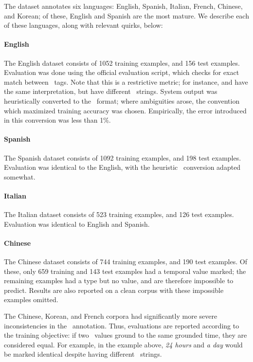 The dataset annotates six languages:
  English, Spanish, Italian, French, Chinese, and Korean;
  of these, English and Spanish are the most mature.
We describe each of these languages, along with relevant quirks, below:

\paragraph{English}
The English dataset consists of 1052 training examples, and 156 test examples.
Evaluation was done using the official evaluation script, which checks for
  exact match between \timex\ tags.
Note that this is a restrictive metric; for instance,  and
   have the same interpretation, but
  have different \timex\ strings.
System output was heuristically converted to the \timex\ format; where
  ambiguities arose, the convention which maximized training accuracy was
  chosen.
Empirically, the error introduced in this conversion was less than 1\%.

\paragraph{Spanish}
The Spanish dataset consists of 1092 training examples, and 198 test examples.
Evaluation was identical to the English, with the heuristic \timex\ conversion
  adapted somewhat.

\paragraph{Italian}
The Italian dataset consists of 523 training examples, and 126 test examples.
Evaluation was identical to English and Spanish.

\paragraph{Chinese}
The Chinese dataset consists of 744 training examples, and 190 test examples.
Of these, only 659 training and 143 test examples had a temporal value marked;
  the remaining examples had a type but no value, and are therefore
  impossible to predict.
Results are also reported on a clean corpus with these impossible examples
  omitted.

The Chinese, Korean, and French corpora had significantly more severe
  inconsistencies in the \timex\ annotation.
Thus, evaluations are reported according to the training objective: if two
  \timex\ values ground to the same grounded time, they are considered equal.
For example, in the example above, \textit{24 hours} and \textit{a day}
  would be marked identical despite having different \timex\ strings.

